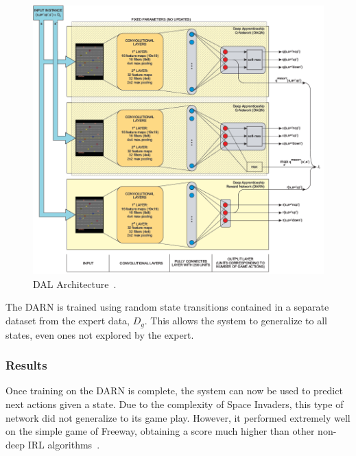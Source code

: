 \documentclass[12pt,american]{report}
\begin{document}
\begin{figure}
\centering
\includegraphics[scale=1]{images/darn-dal.png}
\caption{DAL Architecture~\cite{markovikj2014deep}.}
\label{fig:darn-dal}
\end{figure}
The DARN is trained using random state transitions contained in a separate dataset from the expert data, $D_g$.  This allows the system to generalize to all states, even ones not explored by the expert. 

\subsubsection{Results}
Once training on the DARN is complete, the system can now be used to predict next actions given a state. Due to the complexity of Space Invaders, this type of network did not generalize to its game play. However, it performed extremely well on the simple game of Freeway, obtaining a score much higher than other non-deep IRL algorithms~\cite{markovikj2014deep}. 
\end{document}
